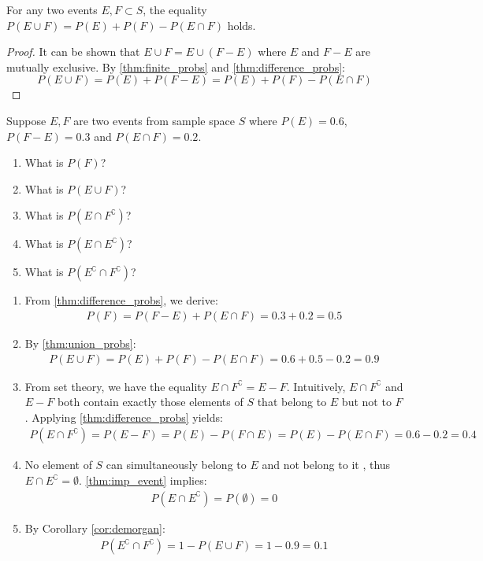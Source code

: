 \begin{theorem}\label{thm:union_probs}
	For any two events \( E, F \subset S \), the equality \( P(E \cup F) = P(E) + P(F) - P(E \cap F) \) holds.
\end{theorem}
\begin{proof}
	It can be shown that \( E \cup F = E \cup (F - E) \)
	where \( E \) and \( F - E \) are mutually exclusive.
	By \autoref{thm:finite_probs} and \autoref{thm:difference_probs}:
	\[
		P(E \cup F) = P(E) + P(F - E) = P(E) + P(F) - P(E \cap F)
	\]
\end{proof}

\begin{exmp}
	Suppose \( E, F \) are two events from sample space \( S \) where \( P(E) = 0.6 \), \( P(F - E) = 0.3 \) and \( P(E \cap F) = 0.2 \).
	\begin{enumerate}
		\item What is \( P(F) \)?
		\item What is \( P(E \cup F) \)?
		\item What is \( P(E \cap F^\complement) \)?
		\item What is \( P(E \cap E^\complement) \)?
		\item What is \( P(E^\complement \cap F^\complement) \)?
	\end{enumerate}
\end{exmp}
\begin{solution}
	\begin{enumerate}
		\item From \autoref{thm:difference_probs}, we derive:
		\begin{align*}
			P(F) = P(F - E) + P(E \cap F) = 0.3 + 0.2 = 0.5
		\end{align*}
		\item By \autoref{thm:union_probs}:
		\begin{align*}
			P(E \cup F) = P(E) + P(F) - P(E \cap F) = 0.6 + 0.5 - 0.2 = 0.9
		\end{align*}
		\item From set theory, we have the equality \( E \cap F^\complement = E - F \).
		Intuitively, \( E \cap F^\complement \) and \( E - F \) both contain exactly those elements of \( S \) that belong to \( E \) but not to \( F \).
		Applying \autoref{thm:difference_probs} yields:
		\begin{align*}
			P(E \cap F^\complement) = P(E - F) = P(E) - P(F \cap E) = P(E) - P(E \cap F) = 0.6 - 0.2 = 0.4
		\end{align*}
		\item No element of \( S \) can simultaneously belong to \( E \) and not belong to it , thus \( E \cap E^\complement = \emptyset \).
		\autoref{thm:imp_event} implies:
		\begin{align*}
			P(E \cap E^\complement ) = P(\emptyset) = 0
		\end{align*}
		\item By Corollary \autoref{cor:demorgan}:
		\begin{align*}
			P(E^\complement \cap F^\complement) = 1 - P(E \cup F) = 1 - 0.9 = 0.1
		\end{align*}
	\end{enumerate}
\end{solution}

